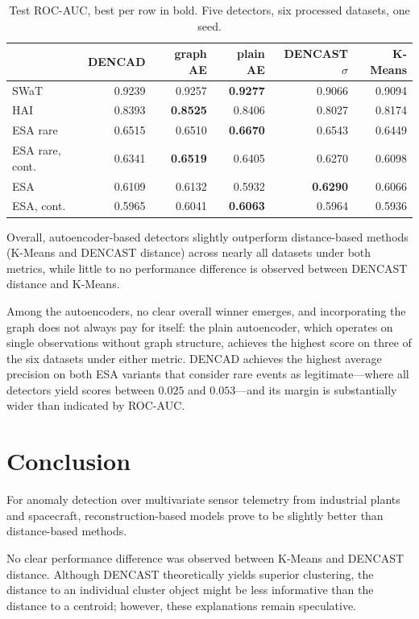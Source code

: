 \documentclass{article}
\begin{document}
\begin{table}[t]
  \centering
  \small
  \caption{Test ROC-AUC, best per row in bold. Five detectors, six processed datasets,
  one seed.}
  \begin{tabular}{lrrrrr}
    \toprule
    & DENCAD & graph AE & plain AE & DENCAST $\sigma$ & K-Means \\
    \midrule
SWaT & 0.9239 & 0.9257 & \textbf{0.9277} & 0.9066 & 0.9094 \\
HAI & 0.8393 & \textbf{0.8525} & 0.8406 & 0.8027 & 0.8174 \\
ESA rare & 0.6515 & 0.6510 & \textbf{0.6670} & 0.6543 & 0.6449 \\
ESA rare, cont. & 0.6341 & \textbf{0.6519} & 0.6405 & 0.6270 & 0.6098 \\
ESA & 0.6109 & 0.6132 & 0.5932 & \textbf{0.6290} & 0.6066 \\
ESA, cont. & 0.5965 & 0.6041 & \textbf{0.6063} & 0.5964 & 0.5936 \\
    \bottomrule
  \end{tabular}
  \label{tab:roc}
\end{table}

Overall, autoencoder-based detectors slightly outperform distance-based methods (K-Means and DENCAST distance) 
across nearly all datasets under both metrics, while little to no performance difference is observed between DENCAST distance and K-Means.

Among the autoencoders, no clear overall winner emerges, and incorporating the graph does not 
always pay for itself: the plain autoencoder, which operates on single observations without 
graph structure, achieves the highest score on three of the six datasets under either metric. 
DENCAD achieves the highest average precision on both ESA variants that consider rare events 
as legitimate---where all detectors yield scores between $0.025$ and $0.053$---and its margin 
is substantially wider than indicated by ROC-AUC.

\section{Conclusion}

For anomaly detection over multivariate sensor telemetry from industrial plants and spacecraft, 
reconstruction-based models prove to be slightly better than distance-based methods. 

No clear performance difference was observed between K-Means and DENCAST distance. 
Although DENCAST theoretically yields superior clustering, the distance to an individual cluster object might be less informative than the distance to a centroid; however, these explanations remain speculative.
\end{document}
